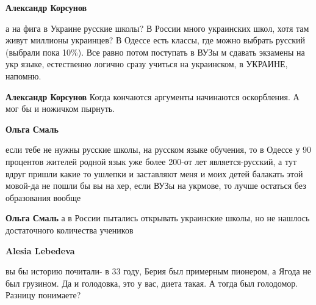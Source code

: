 \begin{itemize}
\begin{itemize}
\textbf{Александр Корсунов} 

а на фига в Украине русские школы? В России много украинских школ, хотя там
живут миллионы украинцев? В Одессе есть классы, где можно выбрать русский
(выбрали пока 10\%). Все равно потом поступать в ВУЗы м сдавать экзамены на укр
языке, естественно логично сразу учиться на украинском, в УКРАИНЕ, напомню.


 
\textbf{Александр Корсунов} Когда кончаются аргументы начинаются оскорбления. А мог бы и ножичком пырнуть.

 
\textbf{Ольга Смаль} 

если тебе не нужны русские школы, на русском языке обучения, то в Одессе у 90
процентов жителей родной язык уже более 200-от лет является-русский, а тут вдруг
пришли какие то ушлепки и заставляют меня и моих детей балакать этой мовой-да
не пошли бы вы на хер, если ВУЗы на укрмове, то лучше остаться без образования
вообще


 
\textbf{Ольга Смаль} а в России пытались открывать украинские школы, но не нашлось достаточного количества учеников

 
\textbf{Alesia Lebedeva} 

вы бы историю почитали- в 33 году, Берия был примерным пионером, а Ягода не был
грузином. Да и голодовка, это у вас, диета такая. А тогда был голодомор.
Разницу понимаете?

 


\end{itemize}
\end{itemize}
